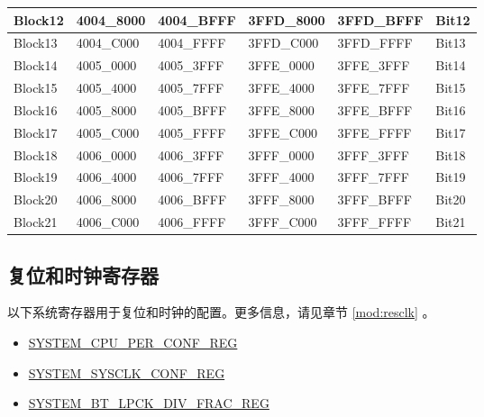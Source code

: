 \documentclass[main\_\_CN.tex]{subfiles}
\begin{document}
\begin{longtable}{|l|l|l|l|l|l|}
\hline
Block12 & \hexprefix{}4004\_8000 & \hexprefix{}4004\_BFFF & \hexprefix{}3FFD\_8000 & \hexprefix{}3FFD\_BFFF & Bit12 \\
\hline
Block13 & \hexprefix{}4004\_C000 & \hexprefix{}4004\_FFFF & \hexprefix{}3FFD\_C000 & \hexprefix{}3FFD\_FFFF & Bit13 \\
\hline
Block14 & \hexprefix{}4005\_0000 & \hexprefix{}4005\_3FFF & \hexprefix{}3FFE\_0000 & \hexprefix{}3FFE\_3FFF & Bit14 \\
\hline
Block15 & \hexprefix{}4005\_4000 & \hexprefix{}4005\_7FFF & \hexprefix{}3FFE\_4000 & \hexprefix{}3FFE\_7FFF & Bit15 \\
\hline
Block16 & \hexprefix{}4005\_8000 & \hexprefix{}4005\_BFFF & \hexprefix{}3FFE\_8000 & \hexprefix{}3FFE\_BFFF & Bit16 \\
\hline
Block17 & \hexprefix{}4005\_C000 & \hexprefix{}4005\_FFFF & \hexprefix{}3FFE\_C000 & \hexprefix{}3FFE\_FFFF & Bit17 \\
\hline
Block18 & \hexprefix{}4006\_0000 & \hexprefix{}4006\_3FFF & \hexprefix{}3FFF\_0000 & \hexprefix{}3FFF\_3FFF & Bit18 \\
\hline
Block19 & \hexprefix{}4006\_4000 & \hexprefix{}4006\_7FFF & \hexprefix{}3FFF\_4000 & \hexprefix{}3FFF\_7FFF & Bit19 \\
\hline
Block20 & \hexprefix{}4006\_8000 & \hexprefix{}4006\_BFFF & \hexprefix{}3FFF\_8000 & \hexprefix{}3FFF\_BFFF & Bit20 \\
\hline
Block21 & \hexprefix{}4006\_C000 & \hexprefix{}4006\_FFFF & \hexprefix{}3FFF\_C000 & \hexprefix{}3FFF\_FFFF & Bit21 \\
\hline
\end{longtable}



\subsection{复位和时钟寄存器} \label{sec:peri-clock-gating-reset}

以下系统寄存器用于复位和时钟的配置。更多信息，请见章节 \ref{mod:resclk}
\textit{}。

\begin{itemize}
    \item \hyperref[regdesc:SYSTEMCPUPERCONFREG]{SYSTEM\_CPU\_PER\_CONF\_REG}
    \item \hyperref[regdesc:SYSTEMSYSCLKCONFREG]{SYSTEM\_SYSCLK\_CONF\_REG}
    \item \hyperref[regdesc:SYSTEMBTLPCKDIVFRACREG]{SYSTEM\_BT\_LPCK\_DIV\_FRAC\_REG}
\end{itemize}
\end{document}
